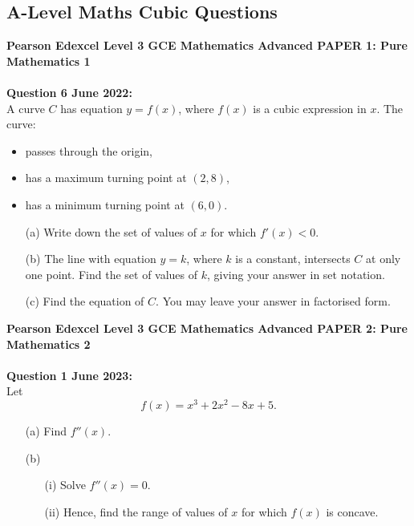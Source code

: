 \documentclass[12pt]{article}
\begin{document}
\subsection{A-Level Maths Cubic Questions}

\textbf{Pearson Edexcel Level 3 GCE Mathematics
Advanced PAPER 1: Pure Mathematics 1}\\\\
\textbf{Question 6 June 2022:}\\
A curve \( C \) has equation \( y = f(x) \), where \( f(x) \) is a cubic expression in \( x \). The curve:
\begin{itemize}
    \item passes through the origin,
    \item has a maximum turning point at \( (2, 8) \),
    \item has a minimum turning point at \( (6, 0) \).
\end{itemize}
\begin{enumerate}
    \item[(a)] Write down the set of values of \( x \) for which \( f'(x) < 0 \).    
    \item[(b)] The line with equation \( y = k \), where \( k \) is a constant, intersects \( C \) at only one point. Find the set of values of \( k \), giving your answer in set notation.    
    \item[(c)] Find the equation of \( C \). You may leave your answer in factorised form.
\end{enumerate}


\textbf{Pearson Edexcel Level 3 GCE Mathematics
Advanced PAPER 2: Pure Mathematics 2}\\\\
\textbf{Question 1 June 2023:}\\
Let \[f(x) = x^3 + 2x^2 - 8x + 5.\]
\begin{enumerate}
    \item[(a)] Find \( f''(x) \). 
    \item[(b)] 
    \begin{enumerate}
        \item[(i)] Solve \( f''(x) = 0 \).
        \item[(ii)] Hence, find the range of values of \( x \) for which \( f(x) \) is concave.\\\\
    \end{enumerate}
\end{enumerate}
\end{document}
